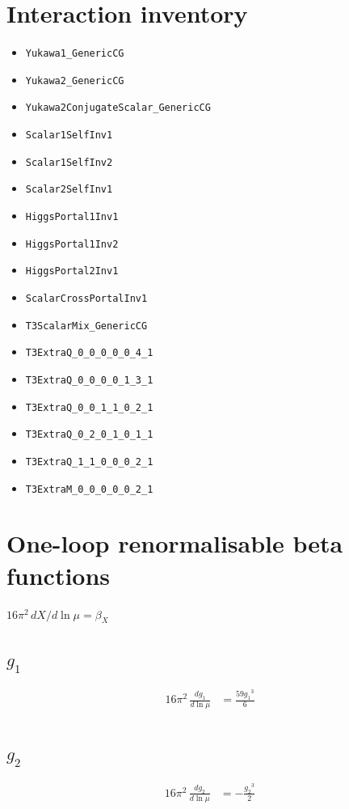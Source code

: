 \documentclass[10pt,a4paper]{article}
\begin{document}
\section*{Interaction inventory}
\begin{itemize}
\item \texttt{Yukawa1\_GenericCG}
\item \texttt{Yukawa2\_GenericCG}
\item \texttt{Yukawa2ConjugateScalar\_GenericCG}
\item \texttt{Scalar1SelfInv1}
\item \texttt{Scalar1SelfInv2}
\item \texttt{Scalar2SelfInv1}
\item \texttt{HiggsPortal1Inv1}
\item \texttt{HiggsPortal1Inv2}
\item \texttt{HiggsPortal2Inv1}
\item \texttt{ScalarCrossPortalInv1}
\item \texttt{T3ScalarMix\_GenericCG}
\item \texttt{T3ExtraQ\_0\_0\_0\_0\_0\_4\_1}
\item \texttt{T3ExtraQ\_0\_0\_0\_0\_1\_3\_1}
\item \texttt{T3ExtraQ\_0\_0\_1\_1\_0\_2\_1}
\item \texttt{T3ExtraQ\_0\_2\_0\_1\_0\_1\_1}
\item \texttt{T3ExtraQ\_1\_1\_0\_0\_0\_2\_1}
\item \texttt{T3ExtraM\_0\_0\_0\_0\_0\_2\_1}
\end{itemize}
\clearpage
\section*{One-loop renormalisable beta functions}
$16\pi^2\,dX/d\ln\mu=\beta_X$
\subsection*{$g_1$}
\begin{align*}
16\pi^2\,\frac{d g_1}{d\ln\mu} &=\frac{59 {g_1}^3}{6} \\
\end{align*}
\subsection*{$g_2$}
\begin{align*}
16\pi^2\,\frac{d g_2}{d\ln\mu} &=-\frac{{g_2}^3}{2} \\
\end{align*}
\end{document}

